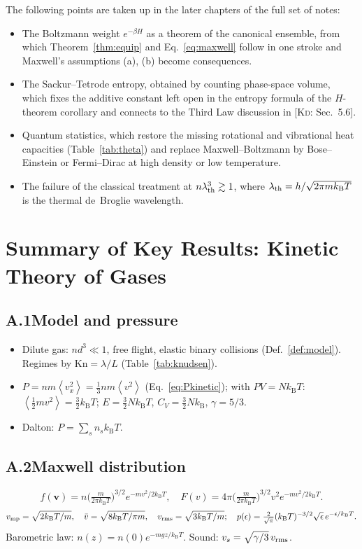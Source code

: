 \documentclass[11pt,a4paper]{report}
\theoremstyle{definition}
\theoremstyle{plain}
\newcommand{\KD}[1]{[\textsc{Kd}: #1]}   %
\newcommand{\kB}{k_{\mathrm{B}}}
\newcommand{\avg}[1]{\left\langle #1\right\rangle}
\newcommand{\vv}{\mathbf{v}}
\newcommand{\vbar}{\bar{v}}
\begin{document}
The following points are taken up in the later chapters of the full set of notes:
\begin{itemize}[nosep]
\item The Boltzmann weight $e^{-\beta H}$ as a theorem of the canonical ensemble, from which Theorem~\ref{thm:equip} and Eq.~\eqref{eq:maxwell} follow in one stroke and Maxwell's assumptions (a), (b) become consequences.
\item The Sackur--Tetrode entropy, obtained by counting phase-space volume, which fixes the additive constant left open in the entropy formula of the $H$-theorem corollary and connects to the Third Law discussion in \KD{Sec.~5.6}.
\item Quantum statistics, which restore the missing rotational and vibrational heat capacities (Table~\ref{tab:theta}) and replace Maxwell--Boltzmann by Bose--Einstein or Fermi--Dirac at high density or low temperature.
\item The failure of the classical treatment at $n\lambda_{\rm th}^3\gtrsim1$, where $\lambda_{\rm th}=h/\sqrt{2\pi m\kB T}$ is the thermal de~Broglie wavelength.
\end{itemize}

\appendix
\chapter{Summary of Key Results: Kinetic Theory of Gases}

\section*{A.1\quad Model and pressure}
\begin{itemize}[nosep]
\item Dilute gas: $nd^3\ll1$, free flight, elastic binary collisions (Def.~\ref{def:model}). Regimes by $\mathrm{Kn}=\lambda/L$ (Table~\ref{tab:knudsen}).
\item $P=nm\avg{v_x^2}=\tfrac13nm\avg{v^2}$ (Eq.~\eqref{eq:Pkinetic}); with $PV=N\kB T$: $\avg{\tfrac12mv^2}=\tfrac32\kB T$; $E=\tfrac32N\kB T$, $C_V=\tfrac32N\kB$, $\gamma=5/3$.
\item Dalton: $P=\sum_sn_s\kB T$.
\end{itemize}

\section*{A.2\quad Maxwell distribution}
\[
f(\vv)=n\Big(\tfrac{m}{2\pi\kB T}\Big)^{3/2}e^{-mv^2/2\kB T},\quad
F(v)=4\pi\Big(\tfrac{m}{2\pi\kB T}\Big)^{3/2}v^2e^{-mv^2/2\kB T}.
\]
\[
v_{\rm mp}=\sqrt{2\kB T/m},\quad\vbar=\sqrt{8\kB T/\pi m},\quad v_{\rm rms}=\sqrt{3\kB T/m};\quad
p(\epsilon)=\tfrac{2}{\sqrt\pi}(\kB T)^{-3/2}\sqrt\epsilon\,e^{-\epsilon/\kB T}.
\]
Barometric law: $n(z)=n(0)e^{-mgz/\kB T}$. Sound: $v_s=\sqrt{\gamma/3}\,v_{\rm rms}$.
\end{document}
